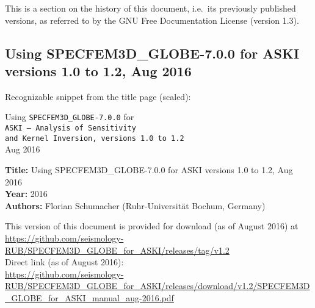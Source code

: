 
%
%
%
This is a section on the history of this document, i.e.\ its previously published versions, as referred to by
the GNU Free Documentation License (version 1.3).

\subsection*{Using SPECFEM3D\_GLOBE-7.0.0 for ASKI versions 1.0 to 1.2, Aug 2016}

Recognizable snippet from the title page (scaled):

\begin{center}
  {\large Using} {\tt \LARGE SPECFEM3D\_GLOBE-7.0.0} {\large for} \\ {\tt {\LARGE ASKI} {\rm--} {\LARGE A}{\small nalysis of} {\LARGE S}{\small ensitivity \\ and} {\LARGE\tt K}{\small ernel} {\LARGE\tt I}{\small nversion, versions 1.0 to 1.2}}\\Aug 2016
\end{center}

{\bf Title: } Using SPECFEM3D\_GLOBE-7.0.0 for ASKI versions 1.0 to 1.2, Aug 2016\\
{\bf Year: } 2016\\
{\bf Authors: } Florian Schumacher (Ruhr-Universit\"at Bochum, Germany)

This version of this document is provided for download (as of August 2016) at\\
\url{https://github.com/seismology-RUB/SPECFEM3D_GLOBE_for_ASKI/releases/tag/v1.2}\\
Direct link (as of August 2016):\\
\url{https://github.com/seismology-RUB/SPECFEM3D_GLOBE_for_ASKI/releases/download/v1.2/SPECFEM3D_GLOBE_for_ASKI_manual_aug-2016.pdf}


